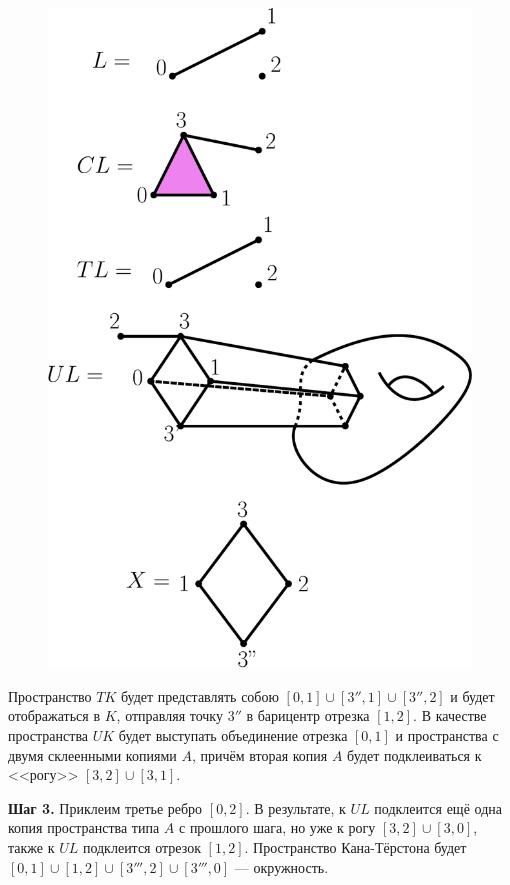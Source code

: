 \documentclass[14pt, dvipsnames, twoside]{extarticle}
\theoremstyle{definition}
\theoremstyle{remark}
\begin{document}
\begin{figure}
\begin{center}
\includegraphics[scale=0.7]{pict5}
\caption{}\label{pict_5}
\end{center}
\end{figure}
 

Пространство $TK$ будет представлять собою $[0, 1]\cup [3'', 1]\cup [3'', 2]$ и будет отображаться в $K$, отправляя точку $3''$ в барицентр отрезка $[1, 2]$. В качестве пространства $UK$ будет выступать объединение отрезка $[0, 1]$ и пространства с двумя склеенными копиями $A$, причём вторая копия $A$ будет подклеиваться к <<рогу>> $[3,2]\cup [3, 1]$. 

{\bf Шаг 3.} Приклеим третье ребро $[0, 2]$. В результате, к $UL$ подклеится ещё одна копия пространства типа $A$ с прошлого шага, но уже к рогу $[3, 2]\cup [3, 0]$, также к $UL$ подклеится отрезок $[1, 2]$. Пространство Кана-Тёрстона будет $[0, 1]\cup [1, 2]\cup [3''', 2]\cup [3''', 0]$ --- окружность.
\end{document}
